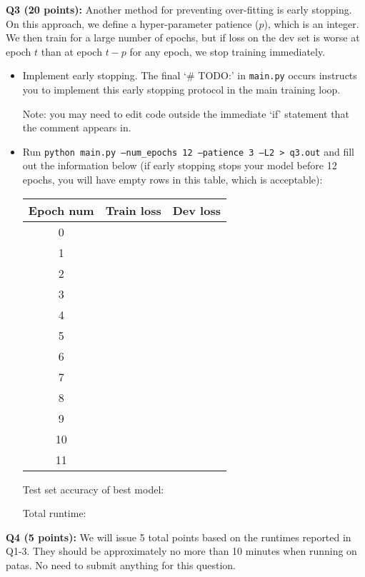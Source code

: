 \documentclass[11pt]{article}
\begin{document}
\vspace{0.4 in}
\noindent
{\bf Q3 (20 points):} Another method for preventing over-fitting is early stopping.  On this approach, we define a hyper-parameter patience ($p$), which is an integer.  We then train for a large number of epochs, but if loss on the dev set is worse at epoch $t$ than at epoch $t-p$ for any epoch, we stop training immediately.
\begin{itemize}
	\item Implement early stopping.  The final `\# TODO:' in \texttt{main.py} occurs instructs you to implement this early stopping protocol in the main training loop.  

		Note: you may need to edit code outside the immediate `if' statement that the comment appears in.
	\item Run \texttt{python main.py --num\_epochs 12 --patience 3 --L2 > q3.out} and fill out the information below (if early stopping stops your model before 12 epochs, you will have empty rows in this table, which is acceptable):
		\begin{center}
		\begin{tabular}[h]{ccc}
			\toprule
			Epoch num & Train loss & Dev loss \\
			\midrule
			0 & & \\
			1 & & \\
			2 & & \\
			3 & & \\
			4 & & \\
			5 & & \\
			6 & & \\
			7 & & \\
			8 & & \\
			9 & & \\
			10 & & \\
			11  & & \\
			\bottomrule
		\end{tabular}
		\end{center}
		Test set accuracy of best model:

		Total runtime:
\end{itemize}



\vspace{0.4 in}
\noindent
{\bf Q4 (5 points):} We will issue 5 total points based on the runtimes reported in Q1-3.  They should be approximately no more than 10 minutes when running on patas.  No need to submit anything for this question.
\end{document}
